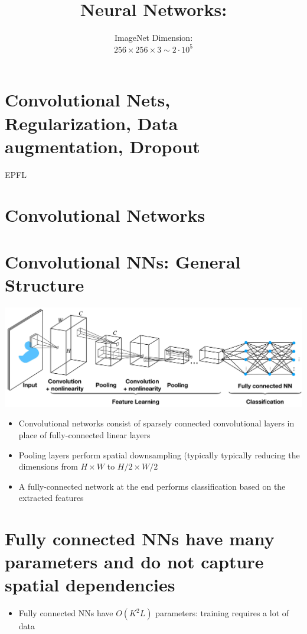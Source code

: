 \documentclass[10pt]{article}
\title{Neural Networks: }
\author{ImageNet Dimension:\\
$256 \times 256 \times 3 \sim 2 \cdot 10^{5}$}
\date{}
\begin{document}
\maketitle
\section*{Convolutional Nets, Regularization, Data augmentation, Dropout}
EPFL

\section*{Convolutional Networks}
\section*{Convolutional NNs: General Structure}
\begin{center}
\includegraphics[max width=\textwidth]{2024_01_08_959e2db67a31f073f6d2g-03}
\end{center}

\begin{itemize}
  \item Convolutional networks consist of sparsely connected convolutional layers in place of fully-connected linear layers
  \item Pooling layers perform spatial downsampling (typically typically reducing the dimensions from $H \times W$ to $H / 2 \times W / 2$
  \item A fully-connected network at the end performs classification based on the extracted features
\end{itemize}

\section*{Fully connected NNs have many parameters and do not capture spatial dependencies }
\begin{itemize}
  \item Fully connected NNs have $O\left(K^{2} L\right)$ parameters: training requires a lot of data
\end{itemize}
\end{document}
